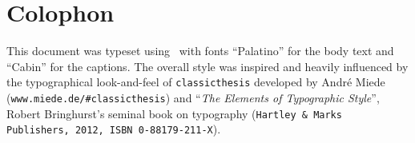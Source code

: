 
\pagestyle{empty}

\hfill

\vfill


\section*{Colophon}
{\small
This document was typeset using \LaTeXe\, with fonts ``Palatino'' for the body text and \textsf{``Cabin''} for the captions.
The overall style was inspired and heavily influenced by the typographical look-and-feel of \texttt{classicthesis} developed by Andr\'e Miede (\texttt{www.miede.de/\#classicthesis}) and ``\emph{The Elements of Typographic Style}'', Robert Bringhurst's seminal book on typography (\texttt{Hartley \& Marks Publishers, 2012, ISBN 0-88179-211-X}). 
}

